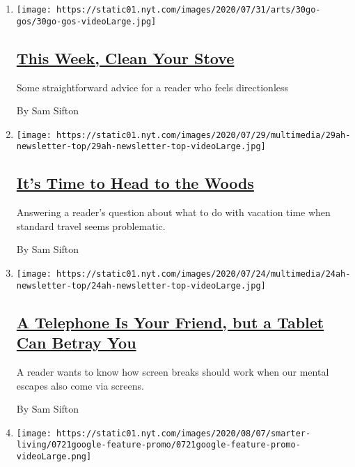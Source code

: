 \begin{enumerate}
\def\labelenumi{\arabic{enumi}.}
\item
  \texttt{[image: https://static01.nyt.com/images/2020/07/31/arts/30go-gos/30go-gos-videoLarge.jpg]}

  \hypertarget{this-week-clean-your-stove}{%
  \subsection{\texorpdfstring{\href{/2020/07/31/at-home/newsletter.html}{This
  Week, Clean Your
  Stove}}{This Week, Clean Your Stove}}\label{this-week-clean-your-stove}}

  Some straightforward advice for a reader who feels directionless

  By Sam Sifton
\item
  \texttt{[image: https://static01.nyt.com/images/2020/07/29/multimedia/29ah-newsletter-top/29ah-newsletter-top-videoLarge.jpg]}

  \hypertarget{its-time-to-head-to-the-woods}{%
  \subsection{\texorpdfstring{\href{/2020/07/29/at-home/newsletter.html}{It's
  Time to Head to the
  Woods}}{It's Time to Head to the Woods}}\label{its-time-to-head-to-the-woods}}

  Answering a reader's question about what to do with vacation time when
  standard travel seems problematic.

  By Sam Sifton
\item
  \texttt{[image: https://static01.nyt.com/images/2020/07/24/multimedia/24ah-newsletter-top/24ah-newsletter-top-videoLarge.jpg]}

  \hypertarget{a-telephone-is-your-friend-but-a-tablet-can-betray-you}{%
  \subsection{\texorpdfstring{\href{/2020/07/24/at-home/newsletter.html}{A
  Telephone Is Your Friend, but a Tablet Can Betray
  You}}{A Telephone Is Your Friend, but a Tablet Can Betray You}}\label{a-telephone-is-your-friend-but-a-tablet-can-betray-you}}

  A reader wants to know how screen breaks should work when our mental
  escapes also come via screens.

  By Sam Sifton
\item
  \texttt{[image: https://static01.nyt.com/images/2020/08/07/smarter-living/0721google-feature-promo/0721google-feature-promo-videoLarge.png]}


\end{enumerate}
